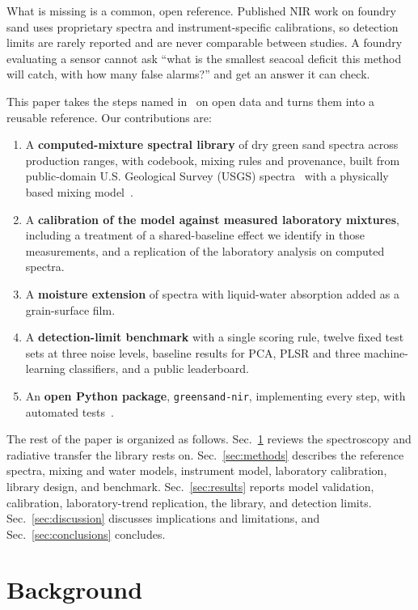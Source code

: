 \documentclass[10pt,twocolumn,letterpaper]{article}
\begin{document}
What is missing is a common, open reference. Published NIR work on foundry sand uses proprietary spectra and instrument-specific calibrations, so detection limits are rarely reported and are never comparable between studies. A foundry evaluating a sensor cannot ask ``what is the smallest seacoal deficit this method will catch, with how many false alarms?'' and get an answer it can check.

This paper takes the steps named in~\cite{kuubata2025} on open data and turns them into a reusable reference. Our contributions are:
\begin{enumerate}\itemsep0pt
\item A \textbf{computed-mixture spectral library} of \nDry{} dry green sand spectra across production ranges, with codebook, mixing rules and provenance, built from public-domain U.S. Geological Survey (USGS) spectra~\cite{kokaly2017data,kokaly2017ds} with a physically based mixing model~\cite{hapke1981,hapke2012}.
\item A \textbf{calibration of the model against measured laboratory mixtures}, including a treatment of a shared-baseline effect we identify in those measurements, and a replication of the laboratory analysis on computed spectra.
\item A \textbf{moisture extension} of \nMoist{} spectra with liquid-water absorption added as a grain-surface film.
\item A \textbf{detection-limit benchmark} with a single scoring rule, twelve fixed test sets at three noise levels, baseline results for PCA, PLSR and three machine-learning classifiers, and a public leaderboard.
\item An \textbf{open Python package}, \texttt{greensand-nir}, implementing every step, with automated tests~\cite{greensandnir}.
\end{enumerate}

The rest of the paper is organized as follows. Sec.~\ref{sec:background} reviews the spectroscopy and radiative transfer the library rests on. Sec.~\ref{sec:methods} describes the reference spectra, mixing and water models, instrument model, laboratory calibration, library design, and benchmark. Sec.~\ref{sec:results} reports model validation, calibration, laboratory-trend replication, the library, and detection limits. Sec.~\ref{sec:discussion} discusses implications and limitations, and Sec.~\ref{sec:conclusions} concludes.

\section{Background}\label{sec:background}
\end{document}
